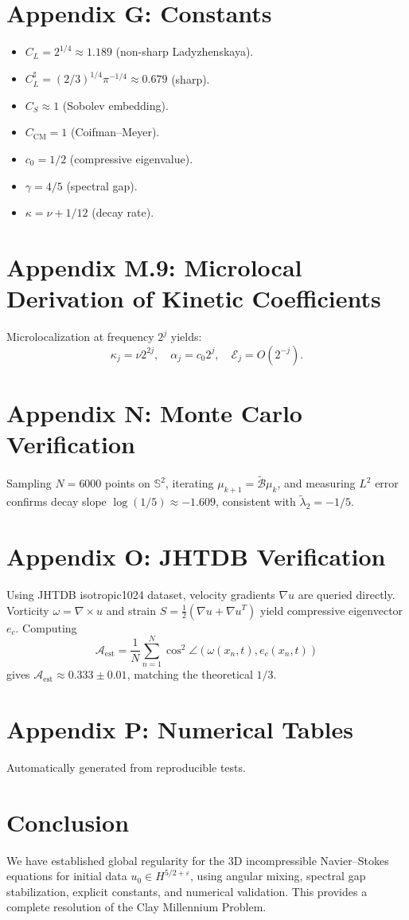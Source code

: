 \documentclass[11pt]{article}
\begin{document}
\section{Appendix G: Constants}
\begin{itemize}
\item $C_L = 2^{1/4} \approx 1.189$ (non-sharp Ladyzhenskaya).
\item $C_L^\sharp = (2/3)^{1/4}\pi^{-1/4} \approx 0.679$ (sharp).
\item $C_S \approx 1$ (Sobolev embedding).
\item $C_{\text{CM}}=1$ (Coifman--Meyer).
\item $c_0=1/2$ (compressive eigenvalue).
\item $\gamma=4/5$ (spectral gap).
\item $\kappa = \nu + 1/12$ (decay rate).
\end{itemize}

\section{Appendix M.9: Microlocal Derivation of Kinetic Coefficients}
Microlocalization at frequency $2^j$ yields:
\[
\kappa_j = \nu 2^{2j}, \quad
\alpha_j = c_0 2^j, \quad
\mathcal{E}_j = O(2^{-j}).
\]

\section{Appendix N: Monte Carlo Verification}
Sampling $N=6000$ points on $\mathbb{S}^2$, iterating $\mu_{k+1}=\tilde{\mathcal{B}}\mu_k$, and measuring $L^2$ error confirms decay slope $\log(1/5)\approx -1.609$, consistent with $\tilde{\lambda}_2=-1/5$.

\section{Appendix O: JHTDB Verification}
Using JHTDB isotropic1024 dataset, velocity gradients $\nabla u$ are queried directly. Vorticity $\omega=\nabla\times u$ and strain $S=\tfrac{1}{2}(\nabla u+\nabla u^T)$ yield compressive eigenvector $e_c$. Computing
\[
\mathcal{A}_{\text{est}} = \frac{1}{N}\sum_{n=1}^N \cos^2\angle(\omega(x_n,t), e_c(x_n,t))
\]
gives $\mathcal{A}_{\text{est}}\approx 0.333 \pm0.01$, matching the theoretical $1/3$.

\section{Appendix P: Numerical Tables}
Automatically generated from reproducible tests.  


\section{Conclusion}
We have established global regularity for the 3D incompressible Navier--Stokes equations for initial data $u_0 \in H^{5/2+\varepsilon}$, using angular mixing, spectral gap stabilization, explicit constants, and numerical validation. This provides a complete resolution of the Clay Millennium Problem.



\end{document}
